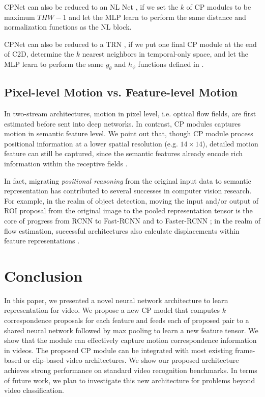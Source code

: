 \documentclass[10pt,twocolumn,letterpaper]{article}
\begin{document}
CPNet can also be reduced to an NL Net \cite{NLNet}, if we set the $k$ of CP modules to be maximum $THW-1$ and let the MLP learn to perform the same distance and normalization functions as the NL block.

CPNet can also be reduced to a TRN \cite{TRN}, if we put one final CP module at the end of C2D, determine the $k$ nearest neighbors in temporal-only space, and let the MLP learn to perform the same $g_\theta$ and $h_\phi$ functions defined in \cite{TRN}. 





\subsection{Pixel-level Motion vs. Feature-level Motion}

In two-stream architectures, motion in pixel level, i.e. optical flow fields, are first estimated before sent into deep networks. 
In contrast, CP modules captures motion in semantic feature level. We point out that, though CP module process positional information at a lower spatial resolution (e.g. $14\times14$), detailed motion feature can still be captured, since the semantic features already encode rich information within the receptive fields \cite{do:convnets:learn:correspondence}. 


In fact, migrating \textit{positional reasoning} from the original input data to semantic representation has contributed to several successes in computer vision research. 
For example, in the realm of object detection, moving the input and/or output of ROI proposal from the original image to the pooled representation tensor is the core of progress from RCNN \cite{RCNN} to Fast-RCNN \cite{Fast:RCNN} and to Faster-RCNN \cite{Faster:RCNN}; in the realm of flow estimation, successful architectures also calculate displacements within feature representations \cite{FlowNet,FlowNet2}.

\section{Conclusion}

In this paper, we presented a novel neural network architecture to learn representation for video. We propose a new CP model that computes $k$ correspondence proposals for each feature and feeds each of proposed pair to a shared neural network followed by max pooling to learn a new feature tensor. We show that the module can effectively capture motion correspondence information in videos. The proposed CP module can be integrated with most existing 
frame-based or clip-based 
video architectures. 
We show our proposed architecture achieves strong performance on standard video recognition benchmarks. In terms of future work, we plan to investigate this new architecture for problems beyond video classification.
\end{document}
